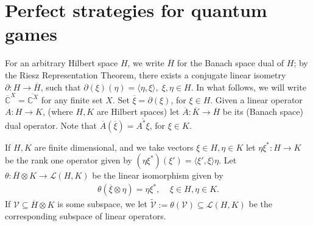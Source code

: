 \documentclass[11pt]{amsart}
\newcommand{\cl}[1]{\mathcal{#1}}
\newcommand{\bb}[1]{\mathbb{#1}}
\begin{document}

\section{Perfect strategies for quantum games}\label{s_perfstrats}

For an arbitrary Hilbert space $H$, we write $\overline{H}$ for the Banach space dual of $H$; by the Riesz Representation Theorem, there exists a conjugate linear isometry $\partial: H\rightarrow \overline{H}$, such that $\partial(\xi)(\eta) = \langle \eta, \xi\rangle, \; \xi, \eta \in H$. In what follows, we will write $\overline{\bb{C}}^{X} = \overline{\bb{C}^{X}}$ for any finite set $X$. Set $\overline{\xi} = \partial(\xi)$, for $\xi \in H$. Given a linear operator $A: H\rightarrow K$, (where $H, K$ are Hilbert spaces) let $\overline{A}: \overline{K}\rightarrow \overline{H}$ be its (Banach space) dual operator. Note that $\overline{A}(\overline{\xi}) = \overline{A^{*}\xi}$, for $\xi \in K$. 

\smallskip

If $H, K$ are finite dimensional, and we take vectors $\xi \in H, \eta \in K$ let $\eta\xi^{*}: H\rightarrow K$ be the rank one operator given by $(\eta\xi^{*})(\xi') = \langle \xi', \xi\rangle\eta$. Let $\theta: \overline{H}\otimes K\rightarrow \cl{L}(H, K)$ be the linear isomorphism given by 
\begin{gather*}
	\theta(\overline{\xi}\otimes \eta) = \eta\xi^{*}, \;\;\;\; \xi \in H, \eta \in K.
\end{gather*}
\noindent If $\cl{V} \subseteq \overline{H}\otimes K$ is some subspace, we let $\tilde{\cl{V}} := \theta(\cl{V}) \subseteq \cl{L}(H, K)$ be the corresponding subspace of linear operators. 

\smallskip
\end{document}
